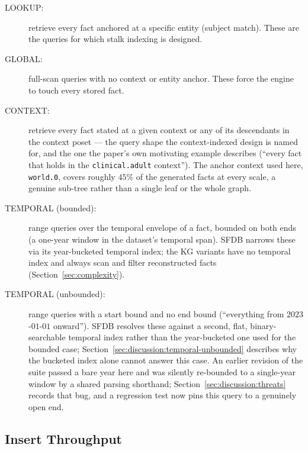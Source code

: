 \begin{description}
    \item[LOOKUP:] retrieve every fact anchored at a specific entity (subject
          match). These are the queries for which stalk indexing is designed.
    \item[GLOBAL:] full-scan queries with no context or entity anchor.
          These force the engine to touch every stored fact.
    \item[CONTEXT:] retrieve every fact stated at a given context or any of
          its descendants in the context poset --- the query shape the
          context-indexed design is named for, and the one the paper's own
          motivating example describes (``every fact that holds in the
          \texttt{clinical.adult} context''). The anchor context used here,
          \texttt{world.0}, covers roughly $45\%$ of the generated facts at
          every scale, a genuine sub-tree rather than a single leaf or the
          whole graph.
    \item[TEMPORAL (bounded):] range queries over the temporal envelope of a
          fact, bounded on both ends (a one-year window in the dataset's
          temporal span). SFDB narrows these via its year-bucketed
          temporal index; the KG variants have no temporal index and
          always scan and filter reconstructed facts
          (Section~\ref{sec:complexity}).
    \item[TEMPORAL (unbounded):] range queries with a start bound and no end
          bound (``everything from $2023$-$01$-$01$ onward''). SFDB resolves
          these against a second, flat, binary-searchable temporal index
          rather than the year-bucketed one used for the bounded case;
          Section~\ref{sec:discussion:temporal-unbounded} describes why the
          bucketed index alone cannot answer this case. An earlier
          revision of the suite passed a bare year here and was silently
          re-bounded to a single-year window by a shared parsing
          shorthand; Section~\ref{sec:discussion:threats} records that
          bug, and a regression test now pins this query to a genuinely
          open end.
\end{description}

\subsection{Insert Throughput}
\label{sec:eval:insert}

